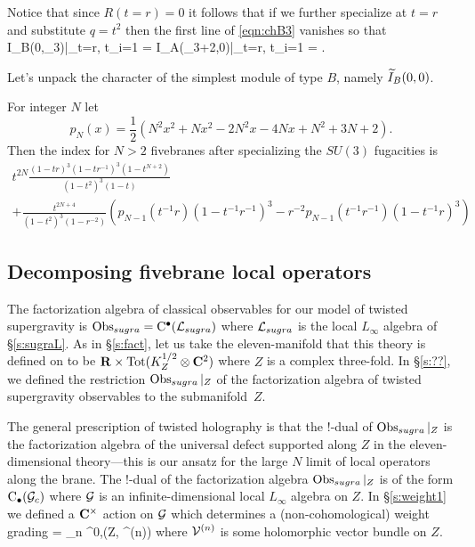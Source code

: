 Notice that since $R(t=r) = 0$ it follows that if we further specialize at $t = r$ and substitute $q = t^2$ then the first line of \eqref{eqn:chB3} vanishes so that
\beqn
\ch \til I_B(0,\lambda_3)|_{t=r, t_i=1} = \ch \til I_A(\lambda_3+2,0)|_{t=r, t_i=1} =  .
\eeqn

\parsec[s:firstcase]

Let's unpack the character of the simplest module of type $B$, namely $\widetilde I_B(0,0)$.


\parsec[s:typeBunrefinedKR]


For integer $N$ let 
\[
p_{N}(x) = \frac12 \left(N^2 x^2 + N x^2 - 2N^2x -4 N x + N^2 + 3N +2\right) .
\]
Then the index for $N > 2$ fivebranes after specializing the $SU(3)$ fugacities is
\begin{multline}
t^{2 N} \frac{(1-tr)^3 (1-tr^{-1})^3 (1-t^{N+2})}{(1-t^2)^3(1 - t)} \\ + \frac{t^{2N + 4}}{(1-t^2)^3 (1-r^{-2})} \left(p_{N-1} (t^{-1} r) (1 - t^{-1} r^{-1})^3 - r^{-2} p_{N-1}(t^{-1} r^{-1})(1-t^{-1}r)^3 \right) 
\end{multline}

\subsection{Decomposing fivebrane local operators}

The factorization algebra of classical observables for our model of twisted supergravity is $\operatorname{Obs}_{sugra} = {\rm C}^\bullet(\mathcal L_{sugra})$ where $\mathcal L_{sugra}$ is the local $L_\infty$ algebra of \S\ref{s:sugraL}. 
As in \S\ref{s:fact}, let us take the eleven-manifold that this theory is defined on to be $\mathbf{R} \times {\rm Tot}(K^{1/2}_Z \otimes \mathbf{C}^2)$ where $Z$ is a complex three-fold.
In \S\ref{s:??}, we defined the restriction $\operatorname{Obs}_{sugra}|_{Z}$ of the factorization algebra of twisted supergravity observables to the submanifold~$Z$.

The general prescription of twisted holography is that the $!$-dual of $\operatorname{Obs}_{sugra}|_Z$ is the factorization algebra of the universal defect supported along $Z$ in the eleven-dimensional theory---this is our ansatz for the large $N$ limit of local operators along the brane.
The $!$-dual of the factorization algebra $\operatorname{Obs}_{sugra}|_Z$ is of the form ${\rm C}_\bullet (\mathcal G_c)$ where $\mathcal G$ is an infinite-dimensional local $L_\infty$ algebra on $Z$.
In \S \ref{s:weight1} we defined a $\mathbf{C}^\times$ action on $\mathcal G$ which determines a (non-cohomological) weight grading
\beqn\label{eqn:decomp2a}
\cG = \bigoplus_{n } \Omega^{0,\bu}(Z, \cV^{(n)}) 
\eeqn
where $\mathcal V^{(n)}$ is some holomorphic vector bundle on $Z$.

